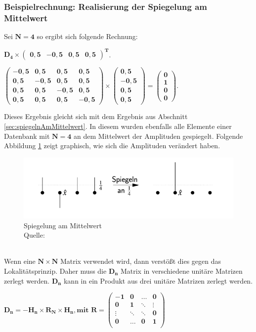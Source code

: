 \subsubsection{Beispielrechnung: Realisierung der Spiegelung am Mittelwert}
Sei $\mathbf{N = 4}$ so ergibt sich folgende Rechnung:
\begin{center}
 $\mathbf{D_4  \times \begin{pmatrix}
		0,5 & -0,5 & 0,5 & 0,5
\end{pmatrix}^T}$.

$\mathbf{\begin{pmatrix}
		-0,5 & 0,5 &0,5&0,5\\
		0,5 & -0,5 &0,5&0,5\\
		0,5 & 0,5 &-0,5&0,5\\
		0,5 & 0,5 &0,5&-0,5
	\end{pmatrix}
	\times \begin{pmatrix} 0,5 \\ -0,5 \\ 0,5 \\ 0,5 \end{pmatrix} = \begin{pmatrix} 0\\1\\0\\0 \end{pmatrix}
}$.
\end{center}
Dieses Ergebnis gleicht sich mit dem Ergebnis aus Abschnitt \ref{sec:spiegelnAmMittelwert}. In diesem wurden ebenfalls alle Elemente einer Datenbank mit $\mathbf{N=4}$ an dem Mittelwert der Amplituden gespiegelt. Folgende Abbildung \ref{fig:spiegelung} zeigt graphisch, wie sich die Amplituden verändert haben.
\begin{figure}[hbtp]
	\centering
	\includegraphics[width=.8\textwidth]{figures/spiegelung.png}
	\caption{Spiegelung am Mittelwert \\ Quelle: \cite[S. 142]{Ho17}}
	\label{fig:spiegelung}
\end{figure}
\noindent
\\
Wenn eine $\mathbf{N \times N}$ Matrix verwendet wird, dann verstößt dies gegen das Lokalitätsprinzip. Daher muss die $\mathbf{D_n}$ Matrix in verschiedene unitäre Matrizen zerlegt werden.  $\mathbf{D_n}$ kann in ein Produkt aus drei unitäre Matrizen zerlegt werden.
\begin{center}
$\mathbf{D_n = -H_n \times R_N \times H_n, \text{mit } R  = 
\begin{pmatrix}
		-1 & 0 &\dots& 0 \\
		0& 1& \ddots& \vdots\\
		\vdots &\ddots& \ddots&0 \\
		0& \dots& 0 &1 \\
\end{pmatrix}}$
\end{center}
